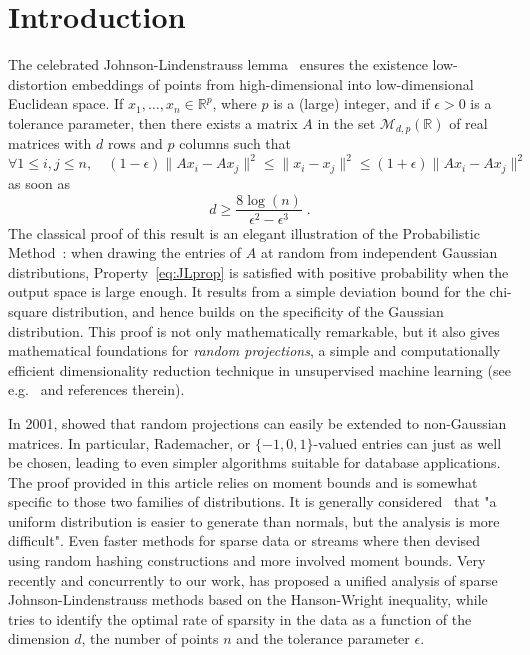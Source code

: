 \documentclass{ps}
\def\R{\mathbb{R}}
\newcommand{\1}{\mathbbm{1}}
\theoremstyle{plain}
\begin{document}
\section{Introduction}
The celebrated Johnson-Lindenstrauss lemma~\cite{JL84}  ensures the existence low-distortion embeddings of points from high-dimensional into low-dimensional Euclidean space. If $x_1,\dots,x_n\in\R^p$, where $p$ is a (large) integer, and if $\epsilon>0$ is a tolerance parameter, then there exists a matrix $A$ in the set $\mathcal{M}_{d,p}(\R)$ of real matrices with $d$ rows and $p$ columns such that 
\begin{equation}\label{eq:JLprop} \forall 1\leq i,j\leq n, \quad (1-\epsilon) \|Ax_i-Ax_j\|^2\leq \|x_i-x_j\|^2 \leq (1+\epsilon) \|Ax_i-Ax_j\|^2 \end{equation}
as soon as 
\begin{equation}\label{eq:JLcond}
	d\geq \frac{8\log(n)}{\epsilon^2-\epsilon^3}\;.\end{equation}
The classical proof of this result is an elegant illustration of the Probabilistic Method~\cite{alon04}: when drawing the entries of $A$ at random from independent Gaussian distributions, Property~\eqref{eq:JLprop} is satisfied with positive probability when the output space is large enough. It results from a simple deviation bound for the chi-square distribution, and hence builds on the specificity of the Gaussian distribution. This proof is not only mathematically remarkable, but it also gives mathematical foundations for \emph{random projections}, a simple and computationally efficient dimensionality reduction technique in unsupervised machine learning (see e.g.~\cite{randomProj01,indyk01,vempala04,sarlos06,clarkson09} and references therein). 

In 2001, \cite{Achlioptas01} showed that random projections can easily be extended to non-Gaussian matrices. In particular, Rademacher, or $\{-1, 0, 1\}$-valued entries  can just as well be chosen, leading to even simpler algorithms suitable for database applications. The proof provided in this article relies on moment bounds and is somewhat specific to those two families of distributions. It is generally considered~\cite{verySparse06} that "a uniform distribution is easier to generate than normals, but the analysis is more difficult". Even faster methods for sparse data or streams where then devised \cite{CHARIKAR20043,sparserJL14} using random hashing constructions and more involved moment bounds. Very recently and concurrently to our work, \cite{simpleJL24} has proposed a unified analysis of sparse Johnson-Lindenstrauss methods based on the Hanson-Wright inequality, while \cite{pmlr-v235-hogsgaard24a} tries to identify the optimal rate of sparsity in the data as a function of the dimension $d$, the number of points $n$ and the tolerance parameter $\epsilon$.
\end{document}
